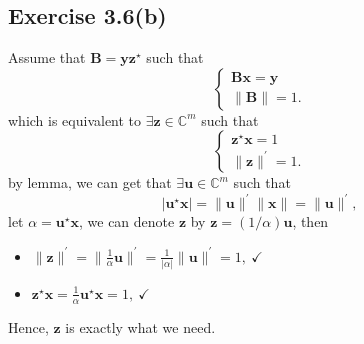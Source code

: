 \documentclass{article}
\begin{document}
\subsection{Exercise 3.6(b)} 
        Assume that $\bm{B} = \bm{y} \bm{z}^{\star}$ such that
        $$
        \begin{cases}
            \bm{Bx} = \bm{y} \\
            \| \bm{B}\| = 1.
        \end{cases}
        $$
        which is equivalent to $\exists \bm{z} \in \mathbb{C}^m$ such that
        $$
        \begin{cases}
            \bm{z}^{\star} \bm{x} = 1 \\
            \| \bm{z}\|^{\prime} = 1.
        \end{cases}
        $$
        by lemma, we can get that $\exists \bm{u} \in \mathbb{C}^{m}$ such that
        $$
        | \bm{u}^\star \bm{x} | = \| \bm{u} \|^\prime \| \bm{x} \| = \| \bm{u} \|^{\prime},
        $$
        let $\alpha =  \bm{u}^\star \bm{x}$, we can denote $\bm{z}$ by $\bm{z} = (1/\alpha) \bm{u}$, then
        \begin{itemize}
            \item $ \| \bm{z} \|^{\prime} = \| \frac{1}{\alpha} \bm{u}\|^{\prime} = \frac{1}{|\alpha|} \| \bm{u} \|^{\prime} = 1, ~ \checkmark$
            \item $ \bm{z}^{\star} \bm{x} = \frac{1}{\alpha} \bm{u}^\star \bm{x} = 1, ~\checkmark$
        \end{itemize}
        Hence, $\bm{z}$ is exactly what we need.
\end{document}
